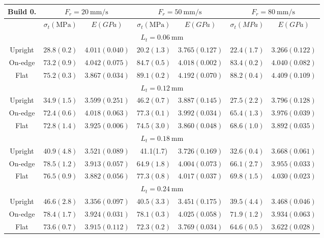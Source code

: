 \documentclass[10pt]{article}
\begin{document}
\begin{center}
\begin{tabular}{|c|c|c|c|c|c|c|}
\hline
\multirow[b]{2}{*}{Build 0.} & \multicolumn{2}{|c|}{$F_{r}=20 \mathrm{~mm} / \mathrm{s}$} & \multicolumn{2}{|c|}{$F_{r}=50 \mathrm{~mm} / \mathrm{s}$} & \multicolumn{2}{|c|}{$F_{r}=80 \mathrm{~mm} / \mathrm{s}$} \\
\hline
 & $\sigma_{t}(\mathrm{MPa})$ & $E(G P a)$ & $\sigma_{t}(\mathrm{MPa})$ & $E(G P a)$ & $\sigma_{t}(M P a)$ & $E(G P a)$ \\
\hline
\multicolumn{7}{|c|}{$L_{t}=0.06 \mathrm{~mm}$} \\
\hline
Upright & $28.8(0.2)$ & $4.011(0.040)$ & $20.2(1.3)$ & $3.765(0.127)$ & $22.4(1.7)$ & $3.266(0.122)$ \\
\hline
On-edge & $73.2(0.9)$ & $4.042(0.075)$ & $84.7(0.5)$ & $4.018(0.002)$ & $83.4(0.2)$ & $4.040(0.082)$ \\
\hline
Flat & $75.2(0.3)$ & $3.867(0.034)$ & $89.1(0.2)$ & $4.192(0.070)$ & $88.2(0.4)$ & $4.409(0.109)$ \\
\hline
\multicolumn{7}{|c|}{$L_{t}=0.12 \mathrm{~mm}$} \\
\hline
Upright & $34.9(1.5)$ & $3.599(0.251)$ & $46.2(0.7)$ & $3.887(0.145)$ & $27.5(2.2)$ & $3.796(0.128)$ \\
\hline
On-edge & $72.4(0.6)$ & $4.018(0.063)$ & $77.3(0.1)$ & $3.992(0.034)$ & $65.4(1.3)$ & $3.976(0.039)$ \\
\hline
Flat & $72.8(1.4)$ & $3.925(0.006)$ & $74.5(3.0)$ & $3.860(0.048)$ & $68.6(1.0)$ & $3.892(0.035)$ \\
\hline
\multicolumn{7}{|c|}{$L_{t}=0.18 \mathrm{~mm}$} \\
\hline
Upright & $40.9(4.8)$ & $3.521(0.089)$ & 41.1(1.7) & $3.726(0.169)$ & $32.6(0.4)$ & $3.668(0.061)$ \\
\hline
On-edge & $78.5(1.2)$ & $3.913(0.057)$ & $64.9(1.8)$ & $4.004(0.073)$ & $66.1(2.7)$ & $3.955(0.033)$ \\
\hline
Flat & $76.5(0.9)$ & $3.882(0.056)$ & $77.3(0.8)$ & $4.017(0.037)$ & $69.8(1.5)$ & $4.030(0.023)$ \\
\hline
\multicolumn{7}{|c|}{$L_{t}=0.24 \mathrm{~mm}$} \\
\hline
Upright & $46.6(2.8)$ & $3.356(0.097)$ & $40.5(3.3)$ & $3.451(0.175)$ & $39.5(4.4)$ & $3.468(0.046)$ \\
\hline
On-edge & $78.4(1.7)$ & $3.924(0.031)$ & $78.1(0.3)$ & $4.025(0.058)$ & $71.9(1.2)$ & $3.934(0.063)$ \\
\hline
Flat & $73.6(0.7)$ & $3.915(0.112)$ & $72.3(0.2)$ & $3.769(0.034)$ & $64.6(0.5)$ & $3.622(0.028)$ \\
\hline
\end{tabular}
\end{center}
\end{document}
